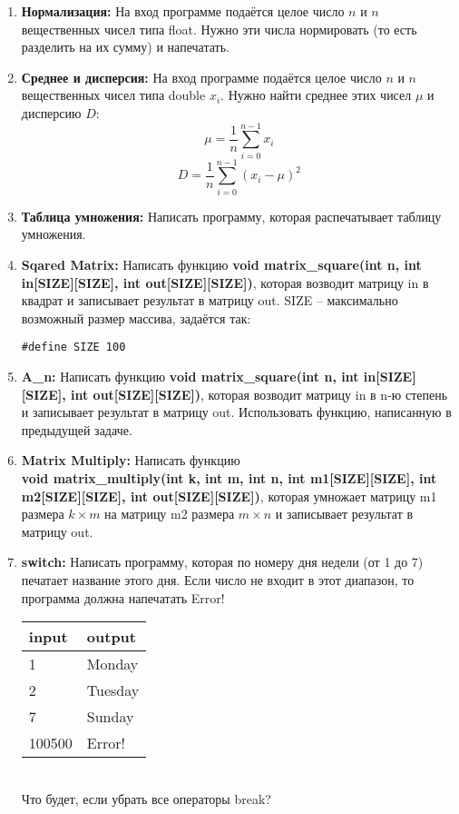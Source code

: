 \documentclass{article}
\begin{document}
\begin{enumerate}
\item \textbf{Нормализация:} На вход программе подаётся целое число $n$ и $n$ вещественных чисел типа float. Нужно эти числа нормировать (то есть разделить на их сумму) и напечатать.
\item \textbf{Среднее и дисперсия:} На вход программе подаётся целое число $n$ и $n$ вещественных чисел типа double ${x_i}$. Нужно найти среднее этих чисел $\mu$ и дисперсию $D$: 
$$\mu = \frac{1}{n}\sum_{i=0}^{n-1}x_i$$
$$D = \frac{1}{n}\sum_{i=0}^{n-1}(x_i - \mu)^2$$
\item \textbf{Таблица умножения:} Написать программу, которая распечатывает таблицу умножения.
\item \textbf{Sqared Matrix:} Написать функцию \textbf{void matrix\_square(int n, int in[SIZE][SIZE], int out[SIZE][SIZE])}, которая возводит матрицу in в квадрат и записывает результат в матрицу out. SIZE -- максимально возможный размер массива, задаётся  так:
\begin{verbatim}
#define SIZE 100
\end{verbatim}
\item \textbf{A\_n:} Написать функцию \textbf{void matrix\_square(int n, int in[SIZE][SIZE], int out[SIZE][SIZE])}, которая возводит матрицу in в n-ю степень и записывает результат в матрицу out. Использовать функцию, написанную в предыдущей задаче.
\item \textbf{Matrix Multiply:} Написать функцию \\ 
\textbf{void matrix\_multiply(int k, int m, int n, int m1[SIZE][SIZE], int m2[SIZE][SIZE], int out[SIZE][SIZE])}, которая умножает матрицу m1 размера $k \times m$ на матрицу m2 размера $m \times n$ и записывает результат в матрицу out.

\item \textbf{switch:} Написать программу, которая по номеру дня недели (от 1 до 7) печатает название этого дня. Если число не входит в этот диапазон, то программа должна напечатать Error!\\
\begin{tabular}{ l | l }
  input & output \\
  \hline
  1 & Monday  \\
  2 & Tuesday  \\
  7 & Sunday  \\
  100500 & Error!  \\
\end{tabular}\\

Что будет, если убрать все операторы break?


\end{enumerate}
\end{document}
